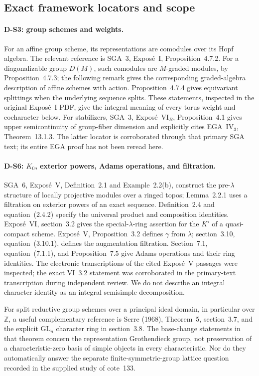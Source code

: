 \documentclass[11pt,a4paper]{article}
\theoremstyle{definition}\newtheorem{definition}{Definition}
\begin{document}
\subsection{Exact framework locators and scope}

\paragraph{D-S3: group schemes and weights.}
For an affine group scheme, its representations are comodules over its Hopf algebra. The relevant reference is SGA~3, Expos\'e~I, Proposition~4.7.2. For a diagonalizable group $D(M)$, such comodules are $M$-graded modules, by Proposition~4.7.3; the following remark gives the corresponding graded-algebra description of affine schemes with action. Proposition~4.7.4 gives equivariant splittings when the underlying sequence splits. These statements, inspected in the original Expos\'e~I PDF, give the integral meaning of every torus weight and cocharacter below. For stabilizers, SGA~3, Expos\'e~VI$_B$, Proposition~4.1 gives upper semicontinuity of group-fiber dimension and explicitly cites EGA~IV$_3$, Theorem~13.1.3. The latter locator is corroborated through that primary SGA text; its entire EGA proof has not been reread here.

\paragraph{D-S6: $K_0$, exterior powers, Adams operations, and filtration.}
SGA~6, Expos\'e~V, Definition~2.1 and Example~2.2(b), construct the pre-$\lambda$ structure of locally projective modules over a ringed topos; Lemma~2.2.1 uses a filtration on exterior powers of an exact sequence. Definition~2.4 and equation~(2.4.2) specify the universal product and composition identities. Expos\'e~VI, section~3.2 gives the special-$\lambda$-ring assertion for the $K'$ of a quasi-compact scheme. Expos\'e~V, Proposition~3.2 defines $\gamma$ from $\lambda$; section~3.10, equation~(3.10.1), defines the augmentation filtration. Section~7.1, equation~(7.1.1), and Proposition~7.5 give Adams operations and their ring identities. The electronic transcriptions of the cited Expos\'e~V passages were inspected; the exact VI~3.2 statement was corroborated in the primary-text transcription during independent review. We do not describe an integral character identity as an integral semisimple decomposition.

For split reductive group schemes over a principal ideal domain, in particular over $\mathbb Z$, a useful complementary reference is Serre (1968), Theorem~5, section~3.7, and the explicit $\mathrm{GL}_n$ character ring in section~3.8. The base-change statements in that theorem concern the representation Grothendieck group, not preservation of a characteristic-zero basis of simple objects in every characteristic. Nor do they automatically answer the separate finite-symmetric-group lattice question recorded in the supplied study of cote~133.
\end{document}
